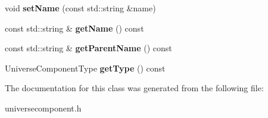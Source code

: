 \begin{DoxyCompactItemize}
\item 
void {\bfseries set\+Name} (const std\+::string \&name)\hypertarget{classUniverseComponent_ac69d32c49d432e23a1435828a3e97d4e}{}\label{classUniverseComponent_ac69d32c49d432e23a1435828a3e97d4e}

\item 
const std\+::string \& {\bfseries get\+Name} () const\hypertarget{classUniverseComponent_a7115f8b2b4f1877d39e4280d889d5bc5}{}\label{classUniverseComponent_a7115f8b2b4f1877d39e4280d889d5bc5}

\item 
const std\+::string \& {\bfseries get\+Parent\+Name} () const\hypertarget{classUniverseComponent_a62a75461599a15b5c28e0daca8669b29}{}\label{classUniverseComponent_a62a75461599a15b5c28e0daca8669b29}

\item 
Universe\+Component\+Type {\bfseries get\+Type} () const\hypertarget{classUniverseComponent_ad601325204de75c91829655f3b735f74}{}\label{classUniverseComponent_ad601325204de75c91829655f3b735f74}

\end{DoxyCompactItemize}


The documentation for this class was generated from the following file\+:\begin{DoxyCompactItemize}
\item 
universecomponent.\+h\end{DoxyCompactItemize}
